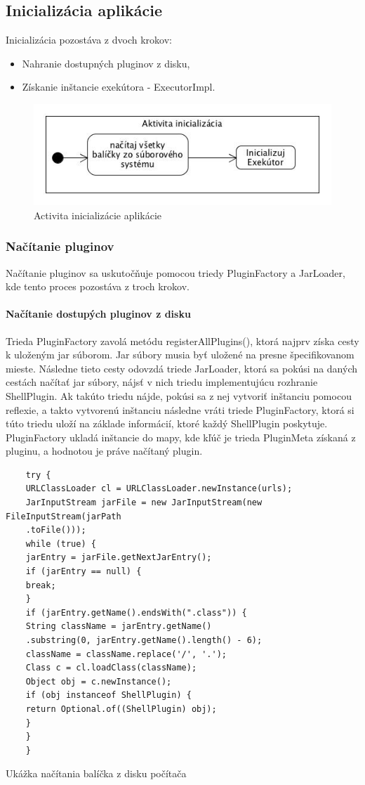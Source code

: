 \subsection{Inicializácia aplikácie}
\indent Inicializácia pozostáva z dvoch krokov:
\begin{itemize}
	\item Nahranie dostupných pluginov z disku,
	\item Získanie inštancie exekútora - ExecutorImpl.
\end{itemize}
\begin{figure}[!htbp]
	\centering
	\includegraphics[scale=0.8]{img/initialization.jpg}
	\caption{Activita inicializácie aplikácie}
	\label{fig:test}
\end{figure}
\subsubsection{Načítanie pluginov}
\indent Načítanie pluginov sa uskutočňuje pomocou triedy PluginFactory a JarLoader, kde tento proces pozostáva z troch krokov.\newline
\paragraph{Načítanie dostupých pluginov z disku} Trieda PluginFactory zavolá metódu registerAllPlugins(), ktorá najprv získa cesty k uloženým jar súborom. Jar súbory musia byť uložené na presne špecifikovanom mieste. Následne tieto cesty odovzdá triede JarLoader, ktorá sa pokúsi na daných cestách načítať \acrshort{jar} súbory, nájsť v nich triedu implementujúcu rozhranie ShellPlugin. Ak takúto triedu nájde, pokúsi sa z nej vytvoriť inštanciu pomocou reflexie, a takto vytvorenú inštanciu následne vráti triede PluginFactory, ktorá si túto triedu uloží na základe informácií, ktoré každý ShellPlugin poskytuje. PluginFactory ukladá inštancie do mapy, kde kľúč je trieda PluginMeta získaná z pluginu, a hodnotou je práve načítaný plugin. 
\begin{algorithm}[H]
	\begin{verbatim}
	try {
	URLClassLoader cl = URLClassLoader.newInstance(urls);
	JarInputStream jarFile = new JarInputStream(new FileInputStream(jarPath
	.toFile()));
	while (true) {
	jarEntry = jarFile.getNextJarEntry();
	if (jarEntry == null) {
	break;
	}
	if (jarEntry.getName().endsWith(".class")) {
	String className = jarEntry.getName()
	.substring(0, jarEntry.getName().length() - 6);
	className = className.replace('/', '.');
	Class c = cl.loadClass(className);
	Object obj = c.newInstance();
	if (obj instanceof ShellPlugin) {
	return Optional.of((ShellPlugin) obj);
	}
	}
	}
	\end{verbatim}
	\caption{Ukážka načítania balíčka z disku počítača}
	\label{alg:gen}
\end{algorithm}
